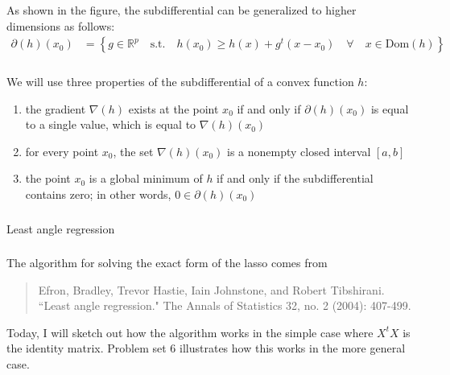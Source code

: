 \begin{frame}[fragile] \frametitle{}

As shown in the figure, the subdifferential can be generalized to
higher dimensions as follows:
\begin{align*}
\partial(h)(x_0) &= \left\{ g \in \mathbb{R}^p \quad \text{s.t.} \quad h(x_0) \geq h(x) + g^t (x - x_0) \quad \forall \quad x \in
\text{Dom}(h) \right\}
\end{align*}

\end{frame}

\begin{frame}[fragile] \frametitle{}

We will use three properties of the subdifferential of a convex
function $h$:
\begin{enumerate}
\item the gradient $\nabla(h)$ exists at the point $x_0$ if and only if
$\partial(h)(x_0)$ is equal to a single value, which is equal to $\nabla(h)(x_0)$ \pause
\item for every point $x_0$, the set $\nabla(h)(x_0)$ is a nonempty closed interval $[a,b]$ \pause
\item the point $x_0$ is a global minimum of $h$ if and only if the subdifferential
contains zero; in other words, $0 \in \partial(h)(x_0)$
\end{enumerate}

\end{frame}

\begin{frame}[fragile] \frametitle{}

{\color{yaleblue}\fontsize{16pt}{20pt}\selectfont Least angle regression}

\end{frame}

\begin{frame}[fragile] \frametitle{}

The algorithm for solving the exact form of the lasso comes from
\begin{quote}
Efron, Bradley, Trevor Hastie, Iain Johnstone, and Robert Tibshirani.
``Least angle regression." The Annals of Statistics 32, no. 2 (2004): 407-499.
\end{quote}
\pause Today, I will sketch out how the algorithm works in the simple case where
$X^tX$ is the identity matrix. Problem set $6$ illustrates how this works in the
more general case.

\end{frame}

